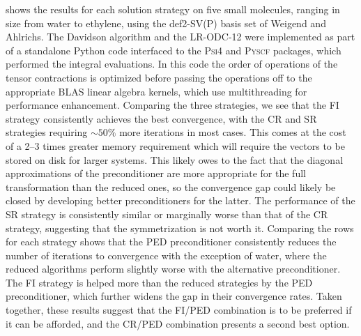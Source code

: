  shows the results for each solution strategy on
five small molecules, ranging in size from water to ethylene, using the
def2-SV(P) basis set\cite{Weigend:2005p3297} of Weigend and Ahlrichs.
The Davidson algorithm and the LR-ODC-12 were implemented as part of a
standalone Python code interfaced to the \textsc{Psi4}\cite{Parrish:2017p3185}
and \textsc{Pyscf}\cite{Sun:2018pe1340} packages, which performed the integral
evaluations.
In this code the order of operations of the tensor contractions is optimized
before passing the operations off to the appropriate BLAS linear algebra
kernels, which use multithreading for performance enhancement.
Comparing the three strategies, we see that the FI strategy consistently
achieves the best convergence, with the CR and SR strategies requiring
\(\sim50\%\) more iterations in most cases.
This comes at the cost of a 2--3 times greater memory requirement which will
require the vectors to be stored on disk for larger systems.
This likely owes to the fact that the diagonal approximations of the
preconditioner are more appropriate for the full transformation than the reduced
ones, so the convergence gap could likely be closed by developing better
preconditioners for the latter.
The performance of the SR strategy is consistently similar or marginally worse
than that of the CR strategy, suggesting that the symmetrization is not
worth it.
Comparing the rows for each strategy shows that the PED preconditioner
consistently reduces the number of iterations to convergence with the exception
of water, where the reduced algorithms perform slightly worse with the
alternative preconditioner.
The FI strategy is helped more than the reduced strategies by the PED
preconditioner, which further widens the gap in their convergence rates.
Taken together, these results suggest that the FI/PED combination is to be
preferred if it can be afforded, and the CR/PED combination presents a second
best option.


